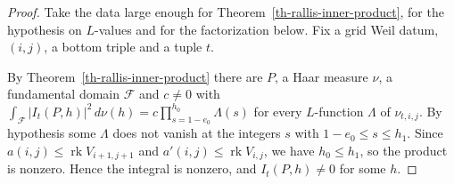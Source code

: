 \begin{proof}
Take the data large enough for Theorem~\ref{th-rallis-inner-product}, for the
hypothesis on $L$-values and for the factorization below. Fix a grid Weil
datum, $(i,j)$, a bottom triple and a tuple $t$.

By Theorem~\ref{th-rallis-inner-product} there are $P$, a Haar measure $\nu$, a
fundamental domain $\mathcal F$ and $c\neq0$ with
$\int_{\mathcal F}|I_t(P,h)|^2\,d\nu(h)=c\prod_{s=1-e_0}^{h_0}\Lambda(s)$ for
every $L$-function $\Lambda$ of $\nu_{t,i,j}$. By hypothesis some $\Lambda$ does
not vanish at the integers $s$ with $1-e_0\leq s\leq h_1$. Since
$a(i,j)\leq\operatorname{rk}V_{i+1,j+1}$ and
$a'(i,j)\leq\operatorname{rk}V_{i,j}$, we have $h_0\leq h_1$, so the product
is nonzero. Hence the integral is nonzero, and $I_t(P,h)\neq0$ for some $h$.


\end{proof}
